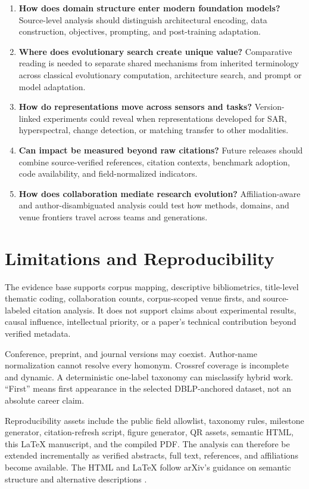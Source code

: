\documentclass[11pt]{article}
\begin{document}
\begin{enumerate}
\item \textbf{How does domain structure enter modern foundation models?}
Source-level analysis should distinguish architectural encoding, data
construction, objectives, prompting, and post-training adaptation.
\item \textbf{Where does evolutionary search create unique value?} Comparative
reading is needed to separate shared mechanisms from inherited terminology
across classical evolutionary computation, architecture search, and prompt or
model adaptation.
\item \textbf{How do representations move across sensors and tasks?}
Version-linked experiments could reveal when representations developed for
SAR, hyperspectral, change detection, or matching transfer to other modalities.
\item \textbf{Can impact be measured beyond raw citations?} Future releases
should combine source-verified references, citation contexts, benchmark
adoption, code availability, and field-normalized indicators.
\item \textbf{How does collaboration mediate research evolution?}
Affiliation-aware and author-disambiguated analysis could test how methods,
domains, and venue frontiers travel across teams and generations.
\end{enumerate}

\section{Limitations and Reproducibility}

The evidence base supports corpus mapping, descriptive bibliometrics,
title-level thematic coding, collaboration counts, corpus-scoped venue firsts,
and source-labeled citation analysis. It does not support claims about
experimental results, causal influence, intellectual priority, or a paper's
technical contribution beyond verified metadata.

Conference, preprint, and journal versions may coexist. Author-name
normalization cannot resolve every homonym. Crossref coverage is incomplete and
dynamic. A deterministic one-label taxonomy can misclassify hybrid work.
``First'' means first appearance in the selected DBLP-anchored dataset, not an
absolute career claim.

Reproducibility assets include the public field allowlist, taxonomy rules,
milestone generator, citation-refresh script, figure generator, QR assets,
semantic HTML, this LaTeX manuscript, and the compiled PDF. The analysis can
therefore be extended incrementally as verified abstracts, full text,
references, and affiliations become available. The HTML and LaTeX follow
arXiv's guidance on semantic structure and alternative descriptions
\cite{arxiv-accessible-html,arxiv-latex-html}.
\end{document}
